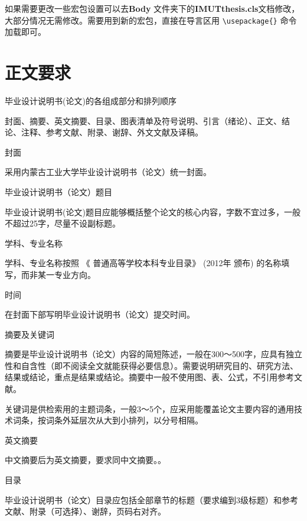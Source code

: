 \documentclass{imutthesis}
\begin{document}
如果需要更改一些宏包设置可以去\textbf{Body} 文件夹下的\textbf{IMUTthesis.cls}文档修改，大部分情况无需修改。需要用到新的宏包，直接在导言区用 \verb|\usepackage{}| 命令加载即可。

\section{正文要求}
\begin{enumerate}
{\bfseries	\item 毕业设计说明书(论文)的各组成部分和排列顺序}
\par\qquad 封面、摘要、英文摘要、目录、图表清单及符号说明、引言（绪论）、正文、结论、注释、参考文献、附录、谢辞、外文文献及译稿。

{\bfseries	\item 封面}
\par\qquad 采用内蒙古工业大学毕业设计说明书（论文）统一封面。

{\bfseries	\item 毕业设计说明书（论文）题目}
\par\qquad 毕业设计说明书(论文)题目应能够概括整个论文的核心内容，字数不宜过多，一般不超过25字，尽量不设副标题。

{\bfseries	\item 学科、专业名称}
\par\qquad 学科、专业名称按照 《 普通高等学校本科专业目录》 (2012年 颁布) 的名称填写，而非某一专业方向。

{\bfseries	\item 时间}
\par\qquad 在封面下部写明毕业设计说明书（论文）提交时间。

{\bfseries	\item 摘要及关键词}
\par\qquad 摘要是毕业设计说明书（论文）内容的简短陈述，一般在300～500字，应具有独立性和自含性（即不阅读全文就能获得必要信息）。需要说明研究目的、研究方法、结果或结论，重点是结果或结论。摘要中一般不使用图、表、公式，不引用参考文献。

\qquad 关键词是供检索用的主题词条，一般3～5个，应采用能覆盖论文主要内容的通用技术词条，按词条外延层次从大到小排列，以分号相隔。

{\bfseries	\item 英文摘要}
\par\qquad 中文摘要后为英文摘要，要求同中文摘要。。

{\bfseries	\item 目录}
\par\qquad 毕业设计说明书（论文）目录应包括全部章节的标题（要求编到3级标题）和参考文献、附录（可选择）、谢辞，页码右对齐。


\end{enumerate}
\end{document}
